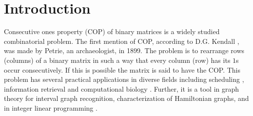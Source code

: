\documentclass[envcountsect, envcountsame, 11pt]{../lib/llncs2e/llncs}
\begin{document}
\section{Introduction}
Consecutive ones property (COP) of binary matrices is a widely studied
combinatorial problem. The first mention of COP, according to D.G. Kendall  \cite{dk69}, was made by Petrie, an archaeologist, in 1899. The problem is to rearrange rows (columns) of a
binary matrix in such a way that every column (row) has its $1$s occur
consecutively. If this is possible the matrix is said to have the COP.
This problem has several practical applications in diverse fields
including scheduling \cite{hl06}, information retrieval \cite{k77} and
computational biology \cite{abh98}.  Further, it is a tool in graph
theory \cite{mcg04} for interval graph recognition, characterization
of Hamiltonian graphs, and in integer linear programming
\cite{ht02,hl06}.    
\end{document}
